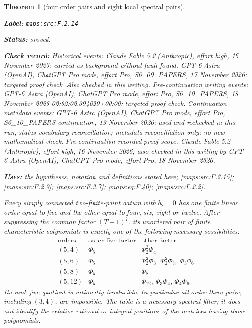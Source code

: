 \documentclass[11pt,a4paper]{article}
\newtheorem{theorem}{Theorem}[section]
\theoremstyle{definition}
\newcommand{\StatementRecord}[4]{\par\smallskip\begingroup\upshape\raggedright\noindent\textbf{Label:} \nolinkurl{#1}.\par\noindent\textbf{Status:} #2.\par\noindent\textbf{Check record:} #3.\par\noindent\textbf{Uses:} #4.\par\endgroup\smallskip}
\begin{document}
\begin{theorem}[four order pairs and eight local spectral pairs]\label{maps:src:F.2.14}
\StatementRecord{maps:src:F.2.14}{proved}{Historical events: Claude Fable 5.2 (Anthropic), effort high, 16 November 2026: carried as background without fault found. GPT-6 Astra (OpenAI), ChatGPT Pro mode, effort Pro, S6\_09\_PAPERS, 17 November 2026: targeted proof check. Also checked in this writing. Pre-continuation writing events: GPT-6 Astra (OpenAI), ChatGPT Pro mode, effort Pro, S6\_10\_PAPERS, 18 November 2026 02:02:02.394029+00:00: targeted proof check. Continuation metadata events: GPT-6 Astra (OpenAI), ChatGPT Pro mode, effort Pro, S6\_10\_PAPERS continuation, 19 November 2026: used and rechecked in this run; status-vocabulary reconciliation; metadata reconciliation only; no new mathematical check. \emph{Pre-continuation recorded proof scope.} Claude Fable 5.2 (Anthropic), effort high, 16 November 2026; also checked in this writing by GPT-6 Astra (OpenAI), ChatGPT Pro mode, effort Pro, 18 November 2026}{the hypotheses, notation and definitions stated here; \cref{maps:src:F.2.15}; \cref{maps:src:F.2.9}; \cref{maps:src:F.2.7}; \cref{maps:eq:F.40}; \cref{maps:src:F.2.2}}


Every simply connected two-finite-point datum with $b_2=0$ has
one finite linear order equal to five and the other equal
to four, six, eight or twelve.
After suppressing the common factor $(T-1)^2$, its unordered
pair of finite characteristic polynomials is exactly one
of the following necessary possibilities:
\[
\begin{array}{c|c|l}
 \text{orders}&\text{order-five factor}&\text{other factor}\\\hline
 (5,4)&\Phi_5&\Phi_2^2\Phi_4\\
 (5,6)&\Phi_5&\Phi_2^2\Phi_3,\ \Phi_2^2\Phi_6,\ \Phi_3\Phi_6\\
 (5,8)&\Phi_5&\Phi_8\\
 (5,12)&\Phi_5&\Phi_{12},\ \Phi_3\Phi_4,\ \Phi_4\Phi_6.
\end{array}
 \tag{F.39}\label{maps:eq:F.39}
\]
Its rank-five quotient is rationally irreducible.
In particular all order-three pairs, including $(3,4)$,
are impossible.  The table is a necessary spectral filter;
it does not identify the relative rational or integral
positions of the matrices having those polynomials.

\end{theorem}
\end{document}
